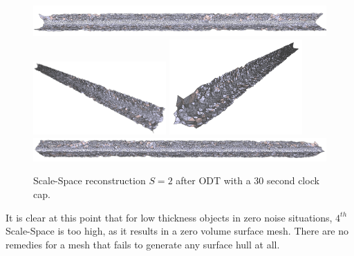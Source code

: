 \documentclass[12pt]{drexelthesis}
\begin{document}
\begin{figure}[!ht]
	\centering
		\includegraphics[width=5in]{simulated-lab-scan/0noise/optimizedNeat/scalespace2odt00.png}
		\includegraphics[width=2in]{simulated-lab-scan/0noise/optimizedNeat/scalespace2odt01.png}
		\includegraphics[width=2in]{simulated-lab-scan/0noise/optimizedNeat/scalespace2odt02.png}
		\includegraphics[width=5in]{simulated-lab-scan/0noise/optimizedNeat/scalespace2odt03.png}
		\caption[Scale-Space reconstruction $S = 2$ after ODT with a 30 second clock cap]{\centering Scale-Space reconstruction $S = 2$ after ODT with a 30 second clock cap.}
	\label{zeronoise:scalespace2odt}
\end{figure}

It is clear at this point that for low thickness objects in zero noise situations, $4^{th}$ Scale-Space is too high, as it results in a zero volume surface mesh. There are no remedies for a mesh that fails to generate any surface hull at all.
\end{document}
